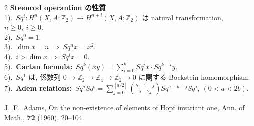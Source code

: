 \documentclass[10pt, leqno]{ltjsarticle}
\newcommand{\z}{\mathbb{Z}}
\newcommand{\sq}[1]{Sq^{#1}}
\numberwithin{equation}{section}
\theoremstyle{plain}
\theoremstyle{definition}
\theoremstyle{remark}
\begin{document}
\begin{paracol}{2}
\noindent
\textbf{Steenrod operantion の性質}\\
1).\ \(\sq{i}:H^n(X,A;\z_2)\to H^{n+i}(X,A;\z_2)\)
は natural transformation,\ \(n\ge0,\ i\ge0.\)\\
2).\ \(\sq{0} = 1.\)\\
3).\ \(\dim x = n\ \Longrightarrow\ \sq{n}x = x^2. \)\\
4).\ \(i>\dim x\ \Longrightarrow\ \sq{i}x = 0.\)\\
5).\ \textbf{Cartan formula:}\ 
\(\sq{k}(x y) = \sum_{i=0}^{k}\sq{i}x\cdot \sq{k-i}y.\)\\
6).\ \(\sq{1}\) は, 係数列 \(0\to\z_2\to\z_4\to\z_2\to0\) 
に関する Bockstein homomorphism.\\
7).\ \textbf{Adem relations:}\ 
\(\sq{a}\sq{b} = \sum_{j=0}^{[a/2]}\binom{b-1-j}{a-2j}
\sq{a+b-j}\sq{j},\ (0<a<2b)\).

\noindent
\cite{Adams1960}
J.~F.~Adams,
\newblock On the non-existence of elements of Hopf invariant one,
\newblock Ann. of Math., {\bf 72} (1960), 20--104.


\end{paracol}
\end{document}
